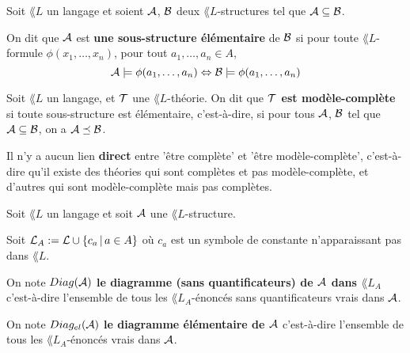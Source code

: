 \documentclass[a4paper, 12pt]{report}
\begin{document}
\begin{definition} 
	Soit $\lang{L}$ un langage et soient $\mathcal{A}$, $\mathcal{B}$ deux
	$\lang{L}$-structures tel que $\mathcal{A} \subseteq \mathcal{B}$.

	On dit que $\mathcal{A}$ est \textbf{une sous-structure élémentaire} de
	$\mathcal{B}$ si pour toute $\lang{L}$-formule $\phi(x_{1}, \dots, x_{n})$,
	pour tout $a_{1}, \dots, a_{n} \in A$,
	\begin{equation}
		\mathcal{A} \models \phi(a_{1}, \dots, a_{n}) \Leftrightarrow \mathcal{B}
		\models \phi(a_{1}, \dots, a_{n})
	\end{equation}
\end{definition}

\begin{definition} 
	Soit $\lang{L}$ un langage, et $\mathcal{T}$ une $\lang{L}$-théorie.
	On dit que \textbf{$\mathcal{T}$ est modèle-complète} si toute sous-structure
	est élémentaire, c'est-à-dire, si pour tous $\mathcal{A}$, $\mathcal{B}$ tel
	que $\mathcal{A} \subseteq \mathcal{B}$, on a $\mathcal{A}
	\preceq \mathcal{B}$.
\end{definition}

\begin{remarque}
	Il n'y a aucun lien \textbf{direct} entre 'être complète' et 'être
	modèle-complète', c'est-à-dire qu'il existe des théories qui sont complètes
	et pas modèle-complète, et d'autres qui sont modèle-complète mais pas complètes.
\end{remarque}

\begin{definition} 
	Soit $\lang{L}$ un langage et soit $\mathcal{A}$ une $\lang{L}$-structure.

	Soit $\mathcal{L}_{A}:= \mathcal{L} \cup \left\{c_{a} \, | \, a \in A \right\}$ où $c_{a}$
	est un symbole de constante n'apparaissant pas dans $\lang{L}$.

	On note $Diag(\mathcal{A})$ \textbf{le diagramme (sans quantificateurs) de
	$\mathcal{A}$ dans $\lang{L}_{A}$} c'est-à-dire l'ensemble de tous les
	$\lang{L}_{A}$-énoncés sans quantificateurs vrais dans $\mathcal{A}$.

	On note $Diag_{el}(\mathcal{A})$ \textbf{le diagramme élémentaire de
	$\mathcal{A}$} c'est-à-dire l'ensemble de tous les $\lang{L}_{A}$-énoncés
	vrais dans $\mathcal{A}$.
\end{definition}
\end{document}
